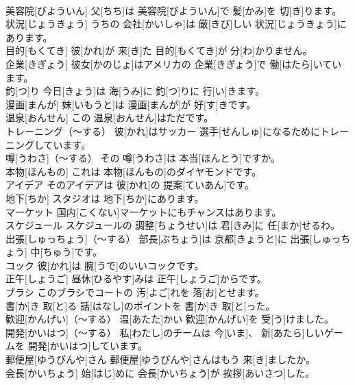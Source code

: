 \documentclass[8pt]{extreport}
\begin{document}
\begin{CJK}{UTF8}{min}
\\	美容院[びよういん]	父[ちち]は 美容院[びよういん]で 髪[かみ]を 切[き]ります。		
\\	状況[じょうきょう]	うちの 会社[かいしゃ]は 厳[きび]しい 状況[じょうきょう]にあります。		
\\	目的[もくてき]	彼[かれ]が 来[き]た 目的[もくてき]が 分[わ]かりません。		
\\	企業[きぎょう]	彼女[かのじょ]はアメリカの 企業[きぎょう]で 働[はたら]いています。		
\\	釣[つ]り	今日[きょう]は 海[うみ]に 釣[つ]りに 行[い]きます。		
\\	漫画[まんが]	妹[いもうと]は 漫画[まんが]が 好[す]きです。		
\\	温泉[おんせん]	この 温泉[おんせん]はただです。		
\\	トレーニング（～する）	彼[かれ]はサッカー 選手[せんしゅ]になるためにトレーニングしています。		
\\	噂[うわさ]（～する）	その 噂[うわさ]は 本当[ほんとう]ですか。		
\\	本物[ほんもの]	これは 本物[ほんもの]のダイヤモンドです。		
\\	アイデア	そのアイデアは 彼[かれ]の 提案[ていあん]です。		
\\	地下[ちか]	スタジオは 地下[ちか]にあります。		
\\	マーケット	国内[こくない]マーケットにもチャンスはあります。		
\\	スケジュール	スケジュールの 調整[ちょうせい]は 君[きみ]に 任[まか]せるわ。		
\\	出張[しゅっちょう]（～する）	部長[ぶちょう]は 京都[きょうと]に 出張[しゅっちょう] 中[ちゅう]です。		
\\	コック	彼[かれ]は 腕[うで]のいいコックです。		
\\	正午[しょうご]	昼休[ひるやす]みは 正午[しょうご]からです。		
\\	ブラシ	このブラシでコートの 汚[よご]れを 落[お]とせます。		
\\	書[か]き 取[と]る	話[はなし]のポイントを 書[か]き 取[と]った。		
\\	歓迎[かんげい]（～する）	温[あたた]かい 歓迎[かんげい]を 受[う]けました。		
\\	開発[かいはつ]（～する）	私[わたし]のチームは 今[いま]、 新[あたら]しいゲームを 開発[かいはつ]しています。		
\\	郵便屋[ゆうびんや]さん	郵便屋[ゆうびんや]さんはもう 来[き]ましたか。		
\\	会長[かいちょう]	始[はじ]めに 会長[かいちょう]が 挨拶[あいさつ]した。		

\end{CJK}
\end{document}
